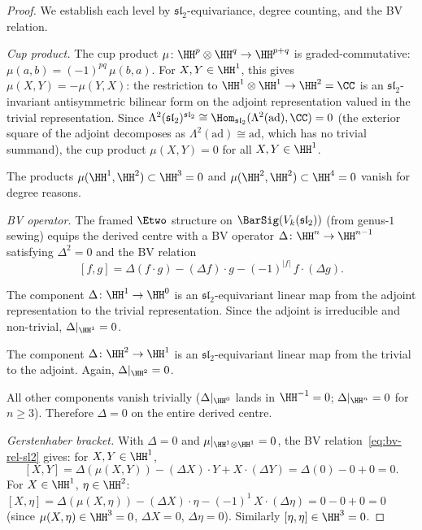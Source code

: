 \begin{proof}
We establish each level by $\mathfrak{sl}_2$-equivariance,
degree counting, and the BV relation.

\textit{Cup product.}
The cup product $\mu\colon \HH^p \otimes \HH^q
\to \HH^{p+q}$ is graded-commutative:
$\mu(a, b) = (-1)^{pq}\,\mu(b, a)$.
For $X, Y \in \HH^1$, this gives
$\mu(X, Y) = -\mu(Y, X)$: the restriction to
$\HH^1 \otimes \HH^1 \to \HH^2 = \CC$ is an
$\mathfrak{sl}_2$-invariant antisymmetric bilinear form
on the adjoint representation valued in the trivial
representation.
Since
$\Lambda^2(\mathfrak{sl}_2)^{\mathfrak{sl}_2}
\cong \Hom_{\mathfrak{sl}_2}(\Lambda^2(\mathrm{ad}), \CC)
= 0$
(the exterior square of the adjoint decomposes as
$\Lambda^2(\mathrm{ad}) \cong \mathrm{ad}$,
which has no trivial summand), the cup product
$\mu(X, Y) = 0$ for all $X, Y \in \HH^1$.

The products $\mu(\HH^1, \HH^2) \subset \HH^3 = 0$ and
$\mu(\HH^2, \HH^2) \subset \HH^4 = 0$ vanish for degree
reasons.

\textit{BV operator.}
The framed $\Etwo$ structure on $\BarSig(V_k(\mathfrak{sl}_2))$
(from genus-$1$ sewing) equips the derived centre with a BV
operator $\Delta\colon \HH^n \to \HH^{n-1}$ satisfying
$\Delta^2 = 0$ and the BV relation
\begin{equation}\label{eq:bv-rel-sl2}
  [f, g]
  = \Delta(f \cdot g) - (\Delta f) \cdot g
  - (-1)^{|f|}\,f \cdot (\Delta g).
\end{equation}

The component $\Delta\colon \HH^1 \to \HH^0$ is an
$\mathfrak{sl}_2$-equivariant linear map from the adjoint
representation to the trivial representation. Since the
adjoint is irreducible and non-trivial,
$\Delta|_{\HH^1} = 0$.

The component $\Delta\colon \HH^2 \to \HH^1$ is an
$\mathfrak{sl}_2$-equivariant linear map from the trivial
to the adjoint. Again, $\Delta|_{\HH^2} = 0$.

All other components vanish trivially
($\Delta|_{\HH^0}$ lands in $\HH^{-1} = 0$;
$\Delta|_{\HH^n} = 0$ for $n \geq 3$). Therefore
$\Delta = 0$ on the entire derived centre.

\textit{Gerstenhaber bracket.}
With $\Delta = 0$ and $\mu|_{\HH^1 \otimes \HH^1} = 0$,
the BV relation~\eqref{eq:bv-rel-sl2} gives:
for $X, Y \in \HH^1$,
\[
  [X, Y]
  = \Delta(\mu(X, Y)) - (\Delta X) \cdot Y
  + X \cdot (\Delta Y)
  = \Delta(0) - 0 + 0 = 0.
\]
For $X \in \HH^1$, $\eta \in \HH^2$:
$[X, \eta] = \Delta(\mu(X, \eta)) - (\Delta X) \cdot \eta
- (-1)^1\,X \cdot (\Delta \eta)
= 0 - 0 + 0 = 0$
(since $\mu(X, \eta) \in \HH^3 = 0$,
$\Delta X = 0$, $\Delta\eta = 0$).
Similarly $[\eta, \eta] \in \HH^3 = 0$.


\end{proof}
